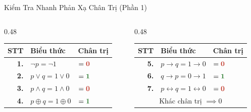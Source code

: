 \documentclass[aspectratio=169, 10pt]{beamer}
\begin{document}
\begin{frame}{Kiểm Tra Nhanh Phản Xạ Chân Trị (Phần 1)}
  \begin{cozyExample}[Bài toán: Cho $p = 1$ (Đúng) và $q = 0$ (Sai). Tính chân trị các biểu thức sau:]
    \small
    \begin{columns}[c, onlytextwidth]
      \begin{column}{0.48\textwidth}
        \centering\renewcommand{\arraystretch}{1.15}
        \begin{tabular}{rll}
          \toprule
          \textbf{STT} & \textbf{Biểu thức} & \textbf{Chân trị} \\
          \midrule
          \textbf{1.} & $\neg p = \neg 1$ & $= \mathbf{\textcolor{cozyFalse}{0}}$ \\
          \textbf{2.} & $p \lor q = 1 \lor 0$ & $= \mathbf{\textcolor{cozyTrue}{1}}$ \\
          \textbf{3.} & $p \land q = 1 \land 0$ & $= \mathbf{\textcolor{cozyFalse}{0}}$ \\
          \textbf{4.} & $p \oplus q = 1 \oplus 0$ & $= \mathbf{\textcolor{cozyTrue}{1}}$ \\
          \bottomrule
        \end{tabular}
      \end{column}
      \begin{column}{0.48\textwidth}
        \centering\renewcommand{\arraystretch}{1.15}
        \begin{tabular}{rll}
          \toprule
          \textbf{STT} & \textbf{Biểu thức} & \textbf{Chân trị} \\
          \midrule
          \textbf{5.} & $p \to q = 1 \to 0$ & $= \mathbf{\textcolor{cozyFalse}{0}}$ \\
          \textbf{6.} & $q \to p = 0 \to 1$ & $= \mathbf{\textcolor{cozyTrue}{1}}$ \\
          \textbf{7.} & $p \leftrightarrow q = 1 \leftrightarrow 0$ & $= \mathbf{\textcolor{cozyFalse}{0}}$ \\
          \multicolumn{3}{c}{\footnotesize\color{cozyMuted}Khác chân trị $\implies 0$} \\
          \bottomrule
        \end{tabular}
      \end{column}
    \end{columns}
  \end{cozyExample}
  \vspace{0.05cm}
  \begin{cozyTrap}

\end{cozyTrap}
\end{frame}
\end{document}
